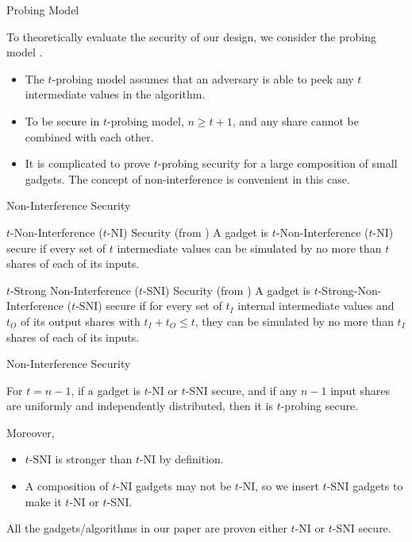 \begin{frame}{Probing Model}

To theoretically evaluate the security of our design, we consider the probing model \cite{C:IshSahWag03}.
\pause
\begin{itemize}
	\item The $t$-probing model assumes that an adversary is able to peek any $t$ intermediate values in the algorithm.
	\pause
	\item To be secure in $t$-probing model, $n \geq t+1$, and any share cannot be combined with each other.
	\pause
	\item It is complicated to prove $t$-probing security for a large composition of small gadgets. The concept of non-interference is convenient in this case.
\end{itemize}

\end{frame}


\begin{frame}{Non-Interference Security}

\begin{definition}{$t$-Non-Interference ($t$-NI) Security (from \cite{CCS:BBDFGS16})}
A gadget is $t$-Non-Interference ($t$-NI) secure if every set of $t$ intermediate values can be simulated by no more than $t$ shares of each of its inputs.
\end{definition}
\medskip

\begin{definition}{$t$-Strong Non-Interference ($t$-SNI) Security (from \cite{CCS:BBDFGS16})}
A gadget is $t$-Strong-Non-Interference ($t$-SNI) secure if for every set of $t_I$ internal intermediate values and $t_O$ of its output shares with $t_I + t_O \leq t$, they can be simulated by no more than $t_I$ shares of each of its inputs.
\end{definition}
\medskip

\end{frame}


\begin{frame}{Non-Interference Security}

For $t = n-1$, if a gadget is $t$-NI or $t$-SNI secure, and if any $n-1$ input shares are uniformly and independently distributed, then it is $t$-probing secure.
\medskip

\pause
Moreover,
\pause
\begin{itemize}
	\item $t$-SNI is stronger than $t$-NI by definition.
	\pause
	\item A composition of $t$-NI gadgets may not be $t$-NI, so we insert $t$-SNI gadgets to make it $t$-NI or $t$-SNI.
\end{itemize}
\pause
All the gadgets/algorithms in our paper are proven either $t$-NI or $t$-SNI secure.

\end{frame}


